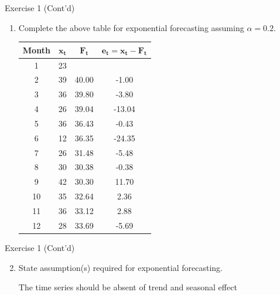 \documentclass[
  ignorenonframetext,
  aspectratio=43,
]{beamer}
\let\olditem\item
\renewcommand\item{\olditem\justifying}
\begin{document}
\begin{frame}{Exercise 1 (Cont'd)}
\protect\hypertarget{exercise-1-contd}{}
\begin{enumerate}
\item
  Complete the above table for exponential forecasting assuming
  \(\alpha = 0.2\). \vspace{0.15cm}

  \pause

  \begin{table}[h!]
   \centering
   \begin{tabular}{c c c c}
   \toprule
   \textbf{Month} & $\mathbf{x_t}$ & $\mathbf{F_t}$ & $\mathbf{e_t = x_t - F_t}$ \\
   \midrule
   1  & 23 &        &         \\
   2  & 39 & 40.00  &  -1.00  \\
   3  & 36 & 39.80  &  -3.80  \\
   4  & 26 & 39.04  & -13.04  \\
   5  & 36 & 36.43  &  -0.43  \\
   6  & 12 & 36.35  & -24.35  \\
   7  & 26 & 31.48  &  -5.48  \\
   8  & 30 & 30.38  &  -0.38  \\
   9  & 42 & 30.30  &  11.70  \\
   10 & 35 & 32.64  &   2.36  \\
   11 & 36 & 33.12  &   2.88  \\
   12 & 28 & 33.69  &  -5.69  \\
   \bottomrule
   \end{tabular}
   \end{table}
\end{enumerate}
\end{frame}

\begin{frame}{Exercise 1 (Cont'd)}
\protect\hypertarget{exercise-1-contd-1}{}
\begin{enumerate}
\setcounter{enumi}{1}
\item
  State assumption(s) required for exponential forecasting.

  \pause

  The time series should be absent of trend and seasonal effect
\end{enumerate}
\end{frame}
\end{document}
